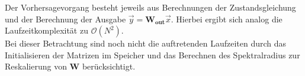 Der Vorhersagevorgang besteht jeweils aus Berechnungen der Zustandsgleichung und der  Berechnung der Ausgabe $\vec{y} = \mathbf{W_{out}} \vec{x}$. Hierbei ergibt sich analog die Laufzeitkomplexität zu $\mathcal{O}(N^2)$.\\

Bei dieser Betrachtung sind noch nicht die auftretenden Laufzeiten durch das Initialisieren der Matrizen im Speicher und das Berechnen des Spektralradius zur Reskalierung von $\mathbf{W}$ berücksichtigt. 
